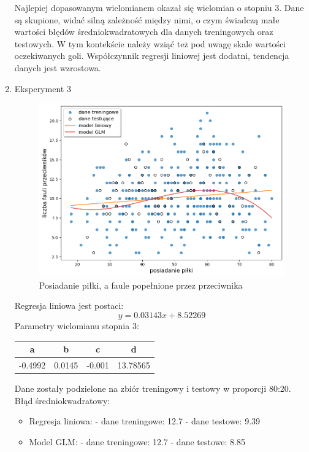 \documentclass[11pt]{article}
\begin{document}
\begin{enumerate}[label=\alph*)]
    Najlepiej dopasowanym wielomianem okazał się wielomian o stopniu 3. Dane są skupione, widać silną zależność między nimi, o czym świadczą małe wartości błędów średniokwadratowych dla danych treningowych oraz testowych. W tym kontekście należy wziąć też pod uwagę skale wartości oczekiwanych goli. Współczynnik regresji liniowej jest dodatni, tendencja danych jest wzrostowa.

    
    \item Eksperyment 3 \newline

    \begin{figure}[hbt]
    \includegraphics[scale=0.30]{fouls.png}
    \caption{Posiadanie piłki, a faule popełnione przez przeciwnika}
    \end{figure}

    Regresja liniowa jest postaci:
    \begin{equation}
    y = 0.03143x + 8.52269
    \end{equation}
    \newpage
      Parametry wielomianu stopnia 3:
    \begin{center}
    \begin{tabular}{| c | c | c | c |}
    \hline
    a & b & c & d \\ \hline
    -0.4992 & 0.0145 & -0.001 & 13.78565 \\ \hline
    \end{tabular}
    \end{center}
    
    Dane zostały podzielone na zbiór treningowy i testowy w proporcji 80:20.
    \newline
    \newline
     Błąd średniokwadratowy:
    \begin{itemize}
    \item Regresja liniowa: \newline
    - dane treningowe: 12.7 \newline
    - dane testowe: 9.39
    \item Model GLM: \newline
    - dane treningowe: 12.7 \newline
    - dane testowe: 8.85
    \end{itemize}


\end{enumerate}
\end{document}
